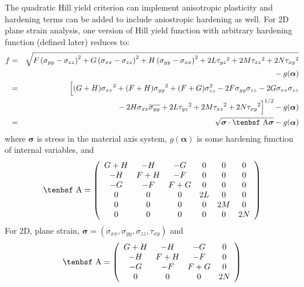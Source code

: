 \documentclass[11pt]{book}
\renewcommand{\vec}[1]{\boldsymbol{#1}}
\def\A{\hbox{\tenbsf A}}
\def\s#1{\sigma_{#1}}
\def\t#1{\tau_{#1}}
\begin{document}
The quadratic Hill yield criterion can implement anisotropic plasticity and hardening terms can be added to include aniostropic hardening as well. For 2D plane strain analysis, one version of Hill yield function with arbitrary hardening function (defined later) reduces to:
\begin{eqnarray}
          f & = & \sqrt{F\left({\s{yy}}- {\s{zz}}\right)^2 + G\left({\s{xx}}- {\s{zz}}\right)^2
               + H\left({\s{yy}}- {\s{xx}}\right)^2 +2L{\t{yz}}^2 +2M{\t{xz}}^2
                 +2N{\t{xy}}^2}
  \nonumber\\
 &&\qquad\mbox{}
                 - g(\vec\alpha) \\
             & = & \Bigl[(G+H){\s{xx}}^2  + (F+H){\s{yy}}^2 + (F+G)\s{zz}^2
                   -2F {\s{yy}}\s{zz} - 2G {\s{xx}}\s{zz}
 \nonumber\\
 &&\qquad\mbox{}
                    - 2H {\s{xx}}\overline{\s{yy}}
                   +2L{\t{yz}}^2 +2M{\t{xz}}^2+2N{\t{xy}}^2\Bigr]^{1/2}  - g(\vec\alpha) \\
             & = & \sqrt{{\vec\sigma} \cdot \A {\vec\sigma}} - g(\vec\alpha) 
\end{eqnarray}
where ${\vec\sigma}$ is stress in the material axis system, $g(\vec\alpha)$ is some hardening function of internal variables, and
\begin{equation}
      \A = \left( \begin{array}{cccccc}
                       G+H & -H & -G & 0 & 0 & 0 \\
                       -H & F+H & -F & 0 & 0 & 0\\
                       -G & -F & F+G & 0 & 0 & 0\\
                        0 & 0 & 0 & 2L & 0 & 0 \\
                       0 & 0 & 0 & 0 & 2M & 0 \\
                      0 & 0 & 0 & 0 & 0 & 2N
                       \end{array} \right)
\end{equation}
For 2D, plane strain, ${\vec\sigma} = ({\s{xx}}, {\s{yy}}, \s{zz}, {\t{xy}})$ and
\begin{equation}
      \A = \left( \begin{array}{cccc}
                       G+H & -H & -G & 0 \\
                       -H & F+H & -F & 0 \\
                       -G & -F & F+G & 0 \\
                       0 & 0 & 0 & 2N
                       \end{array} \right)
\end{equation}
\end{document}
